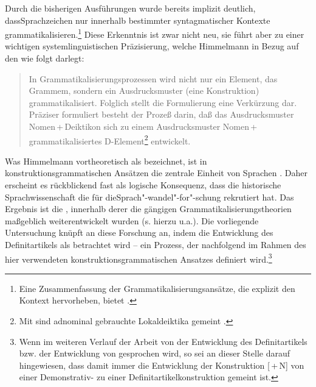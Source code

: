 Durch die bisherigen Ausführungen wurde bereits implizit deutlich, dass\linebreak Sprachzeichen nur innerhalb bestimmter syntagmatischer Kontexte grammatikalisieren.\footnote{Eine Zusammenfassung der Grammatikalisierungsansätze, die explizit den Kontext hervorheben, bietet \textcite{Traugott2003,Traugott2008a}.} 
Diese Erkenntnis ist zwar nicht neu, sie führt aber zu einer wichtigen systemlinguistischen Präzisierung, welche Himmelmann in Bezug auf den  wie folgt darlegt: \blockcquote[31]{Himmelmann1997}{In Grammatikalisierungsprozessen  wird nicht nur ein Element, das Grammem, sondern ein Ausdrucksmuster (eine Konstruktion) grammatikalisiert. Folglich stellt die Formulierung  eine Verkürzung dar. Präziser formuliert besteht der Prozeß darin, daß das Ausdrucksmuster Nomen\,+\,Deiktikon sich zu einem Ausdrucksmuster Nomen\,+\,grammatikalisiertes D-Element\footnote{Mit  sind adnominal gebrauchte Lokaldeiktika gemeint \parencite[6]{Himmelmann1997}.} 
 entwickelt.} 
Was Himmelmann vortheoretisch als  bezeichnet, ist in kon\-struk\-tions\-grammatischen Ansätzen die zentrale Einheit von Sprachen \parencite[s. u.a.][]{Goldberg1995,Goldberg2006}. Daher erscheint es rückblickend fast als logische Konsequenz, dass die historische Sprachwissenschaft die  für die\linebreak Sprach"-wandel"-for"-schung rekrutiert hat. Das Ergebnis ist die  \parencite[vgl. u.a.][]{Barddal2015}, innerhalb derer die gängigen Grammatikalisierungstheorien maßgeblich weiterentwickelt wurden (s. hierzu u.a.\citealt{Traugott2003,Bergs2008,Diewald2008,Fried2013,Traugott2013}). Die vorliegende Untersuchung knüpft an diese Forschung an, indem die Entwicklung des Definitartikels als  betrachtet wird -- ein Prozess, der nachfolgend im Rahmen des hier verwendeten konstruktionsgrammatischen Ansatzes definiert wird.\footnote{Wenn im weiteren Verlauf der Arbeit von der Entwicklung des Definitartikels bzw. der Entwicklung von  gesprochen wird, so sei an dieser Stelle darauf hingewiesen, dass damit immer die Entwicklung der Konstruktion  [\,+\,N] von einer Demonstrativ- zu einer Definitartikelkonstruktion gemeint ist.}  

